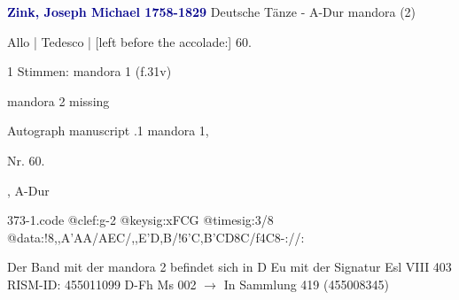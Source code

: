 \documentclass[twocolumn]{book}
\begin{document}
\newline \par \vspace{7pt} \textcolor{darkblue}{\textbf{Zink, Joseph Michael  1758-1829}}
\newline Deutsche Tänze - A-Dur
\newline mandora (2)
\newline \begin{itshape}[f.31v, at left:] Allo | Tedesco | [left before the accolade:] 60.\end{itshape} 
\newline \textcolor{darkblue}{}  1 Stimmen: mandora 1  (f.31v)
\newline \begin{small} mandora 2 missing\end{small} 
\newline Autograph manuscript
.1  mandora 1, \begin{itshape}Nr. 60.\end{itshape}, A-Dur  
\begin{filecontents*}{373-1.code}
@clef:g-2
@keysig:xFCG
@timesig:3/8
@data:!8,,A'AA/AEC/,,E'D,B/!{6'C,B'CD8C}/f4C8-://:
\end{filecontents*}
\newline
%
\newline Der Band mit der mandora 2 befindet sich in D Eu mit der Signatur Esl VIII 403
\newline RISM-ID: 455011099
\newline D-Fh  Ms 002
\newline $\rightarrow$ In Sammlung 419 (455008345)
      
\end{document}
